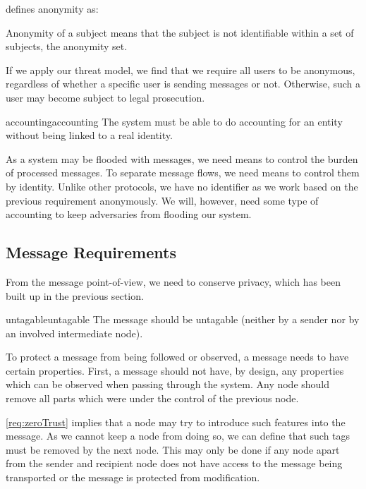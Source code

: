 \cite{anonTerminology} defines anonymity as:
\begin{shadequote}{}
	Anonymity of a subject means that the subject is not identifiable within a set of subjects, the anonymity set.
\end{shadequote}

If we apply our threat model, we find that we require all users to be anonymous, regardless of whether a specific user is sending messages or not. Otherwise, such a user may become subject to legal prosecution. 

\begin{requirement}{accounting}{accounting}
	The system must be able to do accounting for an entity without being linked to a real identity.
\end{requirement}

As a system may be flooded with messages, we need means to control the burden of processed messages. To separate message flows, we need means to control them by identity. Unlike other protocols, we have no identifier as we work based on the previous requirement anonymously. We will, however, need some type of accounting to keep adversaries from flooding our system.

\subsection{Message Requirements}
From the message point-of-view, we need to conserve privacy, which has been built up in the previous section.

\begin{requirement}{untagable}{untagable}
	The message should be untagable (neither by a sender nor by an involved intermediate node).
\end{requirement}

To protect a message from being followed or observed, a message needs to have certain properties. First, a message should not have, by design, any properties which can be observed when passing through the system. Any node should remove all parts which were under the control of the previous node.

\ref{req:zeroTrust} implies that a node may try to introduce such features into the message. As we cannot keep a node from doing so, we can define that such tags must be removed by the next node. This may only be done if any node apart from the sender and recipient node does not have access to the message being transported or the message is protected from modification.

